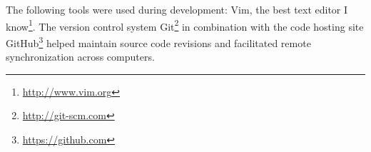The following tools were used during development: Vim, the best text editor I
know\footnote{\url{http://www.vim.org}}. The version control system
Git\footnote{\url{http://git-scm.com}} in combination with the code hosting site
GitHub\footnote{\url{https://github.com}} helped maintain source code revisions
and facilitated remote synchronization across computers.
